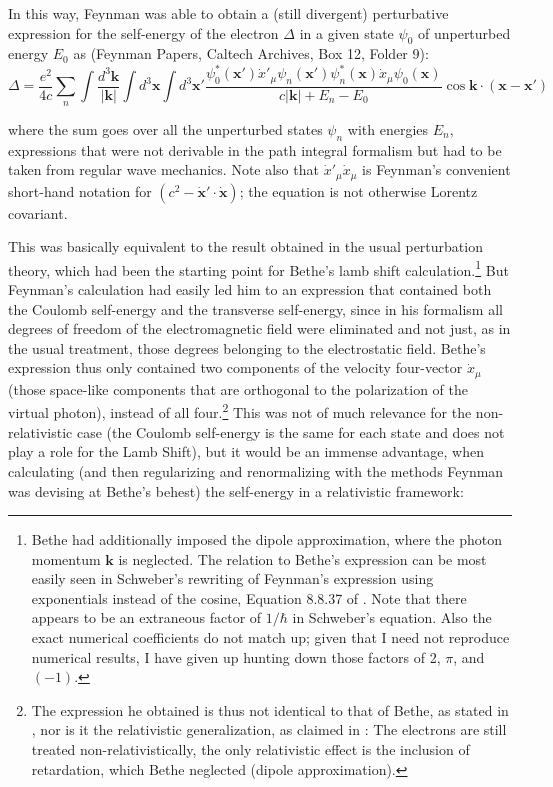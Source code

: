 \documentclass[12pt]{article}
\begin{document}
In this way, Feynman was able to obtain a (still divergent) perturbative expression for the self-energy of the electron $\Delta$ in a given state $\psi_0$ of unperturbed energy $E_0$ as (Feynman Papers, Caltech Archives, Box 12, Folder 9):\\

\begin{equation}
\Delta = \frac{e^2}{4 c} \sum_n \int \frac{d^3 \mathbf{k}}{\left\vert \mathbf{k} \right\vert} \int d^3 \mathbf{x} \int d^3 \mathbf{x}' \frac{\psi^{\ast}_0 (\mathbf{x}') \dot{x}'_{\mu} \psi_n (\mathbf{x}') \psi^{\ast}_n (\mathbf{x}) \dot{x}_{\mu} \psi_0 (\mathbf{x})}{c \left\vert \mathbf{k} \right\vert + E_n - E_0} \cos{\mathbf{k} \cdot (\mathbf{x}-\mathbf{x}')}
\end{equation}

where the sum goes over all the unperturbed states $\psi_n$ with energies $E_n$, expressions that were not derivable in the path integral formalism but had to be taken from regular wave mechanics. Note also that $\dot{x}'_{\mu} \dot{x}_{\mu}$ is Feynman's convenient short-hand notation for $\left( c^2 - \dot{\mathbf{x}}' \cdot \dot{\mathbf{x}} \right)$; the equation is not otherwise Lorentz covariant.

This was basically equivalent to the result obtained in the usual perturbation theory, which had been the starting point for Bethe's lamb shift calculation.\footnote{Bethe had additionally imposed the dipole approximation, where the photon momentum $\mathbf{k}$ is neglected. The relation to Bethe's expression can be most easily seen in Schweber's rewriting of Feynman's expression using exponentials instead of the cosine, Equation 8.8.37 of \citep{schweber_1994_qed}. Note that there appears to be an extraneous factor of $1/\hbar$ in Schweber's equation. Also the exact numerical coefficients do not match up; given that I need not reproduce numerical results, I have given up hunting down those factors of 2, $\pi$, and $(-1)$.} But Feynman's calculation had easily led him to an expression that contained both the Coulomb self-energy and the transverse self-energy, since in his formalism all degrees of freedom of the electromagnetic field were eliminated and not just, as in the usual treatment, those degrees belonging to the electrostatic field. Bethe's expression thus only contained two components of the velocity four-vector $\dot{x}_{\mu}$ (those space-like components that are orthogonal to the polarization of the virtual photon), instead of all four.\footnote{The expression he obtained is thus not identical to that of Bethe, as stated in \citep[p.422]{schweber_1994_qed}, nor is it the relativistic generalization, as claimed in \citep[p.  233]{mehra_1994_the-beat}: The electrons are still treated non-relativistically, the only relativistic effect is the inclusion of retardation, which Bethe neglected (dipole approximation).} This was not of much relevance for the non-relativistic case (the Coulomb self-energy is the same for each state and does not play a role for the Lamb Shift), but it would be an immense advantage, when calculating (and then regularizing and renormalizing with the methods Feynman was devising at Bethe's behest) the self-energy in a relativistic framework:
\end{document}
